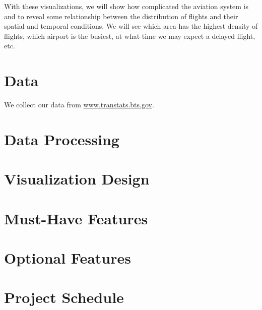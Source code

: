 \documentclass[12pt]{article}
\begin{document}
    With these visualizations, we will show how complicated the aviation system is and to reveal some relationship between the distribution of flights and their spatial and temporal conditions. We will see which area has the highest density of flights, which airport is the busiest, at what time we may expect a delayed flight, etc.    
    
\section{Data}
    We collect our data from \url{www.transtats.bts.gov}.
\section{Data Processing}
\section{Visualization Design}
\section{Must-Have Features}
\section{Optional Features}
\section{Project Schedule}
\end{document}
